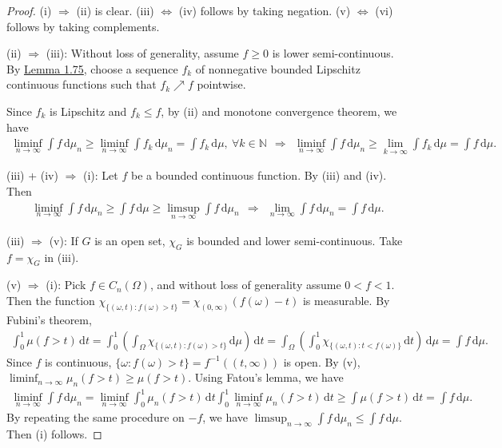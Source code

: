 \documentclass{article}
\numberwithin{equation}{section}
\renewcommand{\d}{\mathrm{d}}
\theoremstyle{plain}
\theoremstyle{definition}
\begin{document}
\begin{proof}
(i) $\Rightarrow$ (ii) is clear. (iii) $\Leftrightarrow$ (iv) follows by taking negation. (v) $\Leftrightarrow$ (vi) follows by taking complements.

\item (ii) $\Rightarrow$ (iii): Without loss of generality, assume $f\geq 0$ is lower semi-continuous. By \hyperref[lemma:1.75]{Lemma 1.75}, choose a sequence $f_k$ of nonnegative bounded Lipschitz continuous functions such that $f_k\nearrow f$ pointwise.

Since $f_k$ is Lipschitz and $f_k\leq f$, by (ii) and monotone convergence theorem, we have
\begin{align*}
	\liminf_{n\to\infty}\int f\,\d \mu_n \geq \liminf_{n\to\infty}\int f_k\,\d \mu_n = \int f_k\,\d \mu,\ \forall k\in\mathbb{N}\ \ \Rightarrow\ \ \liminf_{n\to\infty}\int f\,\d \mu_n\geq \lim_{k\to\infty}\int f_k\,\d \mu = \int f\,\d \mu.
\end{align*}

\item (iii) + (iv) $\Rightarrow$ (i): Let $f$ be a bounded continuous function. By (iii) and (iv). Then
\begin{align*}
	\liminf_{n\to\infty}\int f\,\d \mu_n \geq\int f\,\d \mu \geq \limsup_{n\to\infty}\int f\,\d \mu_n\ \ \Rightarrow\ \ \lim_{n\to\infty}\int f\,\d \mu_n = \int f\,\d \mu.
\end{align*}

\item (iii) $\Rightarrow$ (v): If $G$ is an open set, $\chi_G$ is bounded and lower semi-continuous. Take $f=\chi_G$ in (iii). \vspace{0.1cm}

\item (v) $\Rightarrow$ (i): Pick $f\in C_n(\Omega)$, and without loss of generality assume $0<f<1$. Then the function $\chi_{\{(\omega,t):f(\omega)>t\}} = \chi_{(0,\infty)}(f(\omega)-t)$ is measurable. By Fubini's theorem,
\begin{align*}
	\int_0^1\mu(f>t)\,\d t = \int_0^1\left(\int_\Omega\chi_{\{(\omega,t):f(\omega)>t\}}\,\d \mu\right)\,\d t = \int_\Omega\left(\int_0^1\chi_{\{(\omega,t):t<f(\omega)\}}\,\d t\right)\,\d \mu = \int f\,\d \mu.
\end{align*}
Since $f$ is continuous, $\{\omega:f(\omega)>t\}=f^{-1}((t,\infty))$ is open. By (v), $\liminf_{n\to\infty}\mu_n(f>t)\geq\mu(f>t)$. Using Fatou's lemma, we have
\begin{align*}
	\liminf_{n\to\infty}\int f\,\d \mu_n = \liminf_{n\to\infty}\int_0^1\mu_n(f>t)\,\d t\int_0^1\liminf_{n\to\infty}\mu_n(f>t)\,\d t\geq\int\mu(f>t)\,\d t = \int f\,\d \mu.
\end{align*}
By repeating the same procedure on $-f$, we have $\limsup_{n\to\infty}\int f\,\d \mu_n\leq\int f\,\d \mu$. Then (i) follows. \vspace{0.1cm}


\end{proof}
\end{document}
